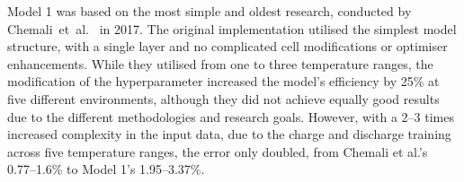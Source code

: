 
%
%
Model 1 was based on the most simple and oldest research, conducted by \linebreak\mbox{Chemali et al.~\cite{Chemali2017}} in 2017.
The original implementation utilised the simplest model structure, with a single layer and no complicated cell modifications or optimiser enhancements.
While they utilised from one to three temperature ranges, the modification of the hyperparameter increased the model's efficiency by 25\% at five different environments, although they did not achieve equally good results due to the different methodologies and research goals.
However, with a 2--3 times increased complexity in the input data, due to the charge and discharge training across five temperature ranges, the error only doubled, from Chemali et al.'s~\cite{Chemali2017} 0.77--1.6\% to Model 1's 1.95--3.37\%.

